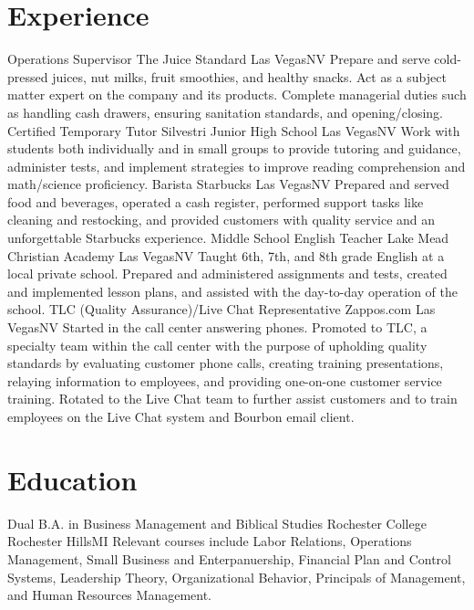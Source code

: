 \documentclass[11pt]{moderncv}
\title{}
\begin{document}
\maketitle
\section{Experience}
			{Operations Supervisor}
			{The Juice Standard}
			{Las Vegas}{NV}
			{Prepare and serve cold-pressed juices, nut milks, fruit smoothies, and healthy snacks. Act as a subject matter expert on the company and its products. Complete managerial duties such as handling cash drawers, ensuring sanitation standards, and opening/closing.}
			{Certified Temporary Tutor}
			{Silvestri Junior High School}
			{Las Vegas}{NV}
			{Work with students both individually and in small groups to provide tutoring and guidance, administer tests, and implement strategies to improve reading comprehension and math/science proficiency.}
			{Barista}
			{Starbucks}
			{Las Vegas}{NV}
			{Prepared and served food and beverages, operated a cash register, performed support tasks like cleaning and restocking, and provided customers with quality service and an unforgettable Starbucks experience.}
			{Middle School English Teacher}
			{Lake Mead Christian Academy}
			{Las Vegas}{NV}
			{Taught 6th, 7th, and 8th grade English at a local private school. Prepared and administered assignments and tests, created and implemented lesson plans, and assisted with the day-to-day operation of the school.}
			{TLC (Quality Assurance)/Live Chat Representative}
			{Zappos.com}
			{Las Vegas}{NV}
			{Started in the call center answering phones. Promoted to TLC, a specialty team within the call center with the purpose of upholding quality standards by evaluating customer phone calls, creating training presentations, relaying information to employees, and providing one-on-one customer service training. Rotated to the Live Chat team to further assist customers and to train employees on the Live Chat system and Bourbon email client.}
\section{Education}
			{Dual B.A. in Business Management and Biblical Studies}
			{Rochester College}
			{Rochester Hills}{MI}
			{Relevant courses include Labor Relations, Operations Management, Small Business and Enterpanuership, Financial Plan and Control Systems, Leadership Theory, Organizational Behavior, Principals of Management, and Human Resources Management.}
\end{document}
